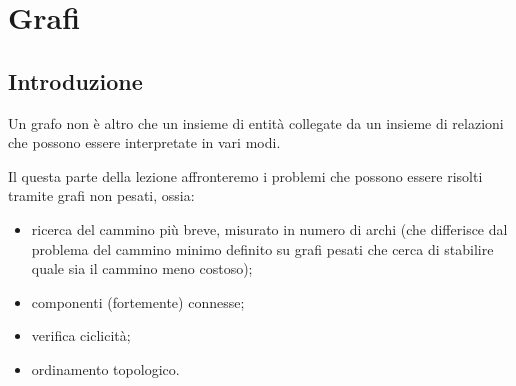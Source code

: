 
\ifsubfile
\pagestyle{plain}
\setcounter{chapter}{8}


\fi
\chapter{Grafi}

\section{Introduzione}

Un grafo non è altro che un insieme di entità collegate da un insieme di relazioni che possono essere interpretate in vari modi.

Il questa parte della lezione affronteremo i problemi che possono essere risolti tramite grafi non pesati, ossia:
\begin{itemize}
	\item ricerca del cammino più breve, misurato in numero di archi (che differisce dal problema del cammino minimo definito su grafi pesati che cerca di stabilire quale sia il cammino meno costoso);
	\item componenti (fortemente) connesse;
	\item verifica ciclicità;
	\item ordinamento topologico.
\end{itemize}

\begin{comment}
\subsection{Esempi}

Moltissimi problemi possono essere visti come problemi su grafi.
Sebbene i problemi abbiano forma astratta, le loro applicazioni si trovano poi negli ambiti più disparati.
Ad esempio:
\begin{itemize}
	\item Quando cercate qualcuno su LinkedIn, vi restituisce un \enquote{grado di conoscenza};
	\item L'ordinamento topologico viene utilizzato per stabilire un ordine di azioni in un grafo di dipendenze;
	\item Gli algoritmi di model checking utilizzati per la verifica formale del software sono basati sull'identificazione delle componenti fortemente connesse.
\end{itemize}

Dalle testimonianze otteniamo il grafo degli incontri, ma abbiamo bisogno di ragionare sul grafo degl intervalli.
\end{comment}

